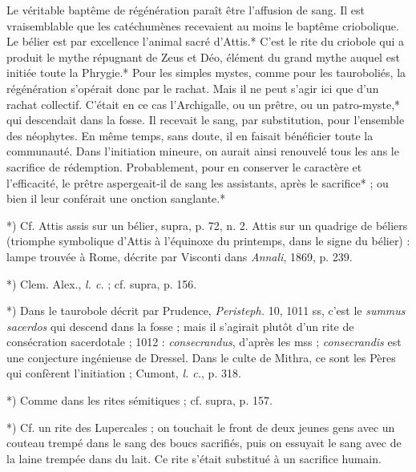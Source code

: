 \documentclass[a4paper, 11pt, oneside, polutonikogreek, french]{article}
\begin{document}
Le véritable baptême de régénération paraît être l'affusion de sang. Il est vraisemblable que les catéchumènes recevaient au moins le baptême criobolique. Le bélier est par excellence l'animal sacré d'Attis.* C'est le rite du criobole qui a produit le mythe répugnant de Zeus et Déo, élément du grand mythe auquel est initiée toute la Phrygie.* Pour les simples mystes, comme pour les tauroboliés, la régénération s'opérait donc par le rachat. Mais il ne peut s'agir ici que d'un rachat collectif. C'était en ce cas l'Archigalle, ou un prêtre, ou un patro-myste,* qui descendait dans la fosse. Il recevait le sang, par substitution, pour l'ensemble des néophytes. En même temps, sans doute, il en faisait bénéficier toute la communauté. Dans l'initiation mineure, on aurait ainsi renouvelé tous les ans le sacrifice de rédemption. Probablement, pour en conserver le caractère et l'efficacité, le prêtre aspergeait-il de sang les assistants, après le sacrifice* ; ou bien il leur conférait une onction sanglante.*

*) Cf. Attis assis sur un bélier, supra, p. 72, n. 2. Attis sur un quadrige de béliers (triomphe symbolique d'Attis à l'équinoxe du printemps, dans le signe du bélier) : lampe trouvée à Rome, décrite par Visconti dans \emph{Annali}, 1869, p. 239.

*) Clem. Alex., \emph{l. c.} ; cf. supra, p. 156.

*) Dans le taurobole décrit par Prudence, \emph{Peristeph.} 10, 1011 ss, c'est le \emph{summus sacerdos} qui descend dans la fosse ; mais il s'agirait plutôt d'un rite de consécration sacerdotale ; 1012 : \emph{consecrandus}, d'après les mss ; \emph{consecrandis} est une conjecture ingénieuse de Dressel. Dans le culte de Mithra, ce sont les Pères qui confèrent l'initiation ; Cumont, \emph{l. c.}, p. 318.

*) Comme dans les rites sémitiques ; cf. supra, p. 157.

*) Cf. un rite des Lupercales ; on touchait le front de deux jeunes gens avec un couteau trempé dans le sang des boucs sacrifiés, puis on essuyait le sang avec de la laine trempée dans du lait. Ce rite s'était substitué à un sacrifice humain.
\end{document}
